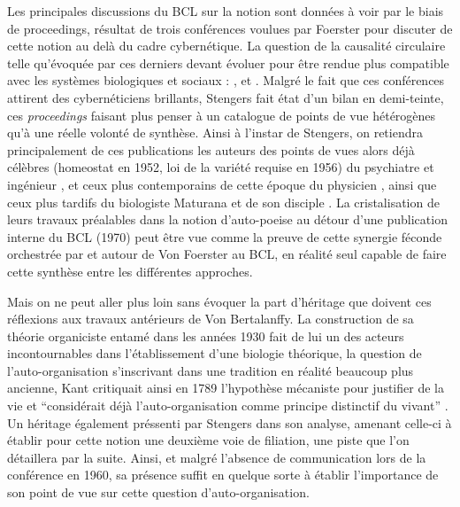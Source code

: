 Les principales discussions du BCL sur la notion sont données à voir par le biais de proceedings, résultat de trois conférences voulues par Foerster pour discuter de cette notion au delà du cadre cybernétique. La question de la causalité circulaire telle qu'évoquée par ces derniers devant évoluer pour être rendue plus compatible avec les systèmes biologiques et sociaux : \autocite{Yovits1960}, \autocite{Yovits1962} et \autocite{Foerster1962}. Malgré le fait que ces conférences attirent des cybernéticiens brillants, Stengers \autocite[87]{CREA1985} fait état d'un bilan en demi-teinte, ces \textit{proceedings} faisant plus penser à un catalogue de points de vue hétérogènes qu'à une réelle volonté de synthèse. Ainsi à l'instar de Stengers, on retiendra principalement de ces publications les auteurs des points de vues alors déjà célèbres (homeostat en 1952, loi de la variété requise en 1956) du psychiatre et ingénieur \autocites{Ashby1947, Ashby1962}, et ceux plus contemporains de cette époque du physicien \textcite{Foerster1959}, ainsi que ceux plus tardifs du biologiste Maturana et de son disciple \textcite{Varela1974}. La cristalisation de leurs travaux préalables dans la notion d'auto-poeise au détour d'une publication interne du BCL (1970) peut être vue comme la preuve de cette synergie féconde orchestrée par et autour de Von Foerster au BCL, en réalité seul capable de faire cette synthèse entre les différentes approches. \autocites{Muller2007a, Muller2007b, Varela1995} \autocites[55-56]{CREA1985}

Mais on ne peut aller plus loin sans évoquer la part d'héritage que doivent ces réflexions aux travaux antérieurs de Von Bertalanffy. La construction de sa théorie organiciste entamé dans les années 1930 fait de lui un des acteurs incontournables dans l'établissement d'une biologie théorique, la question de l'auto-organisation s'inscrivant dans une tradition en réalité beaucoup plus ancienne, Kant critiquait ainsi en 1789 l'hypothèse mécaniste pour justifier de la vie et \enquote{considérait déjà l'auto-organisation comme principe distinctif du vivant} \autocites[76]{Pouvreau2013}[275]{Mossio2010}[6]{Mossio2014}. Un héritage également préssenti par Stengers dans son analyse, amenant celle-ci à établir pour cette notion une deuxième voie de filiation, une piste que l'on détaillera par la suite. Ainsi, et malgré l'absence de communication lors de la conférence en 1960, sa présence suffit en quelque sorte à établir l'importance de son point de vue sur cette question d'auto-organisation.

